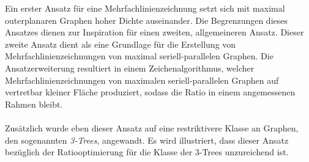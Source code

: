 Ein erster Ansatz für eine Mehrfachlinienzeichnung setzt sich mit maximal outerplanaren Graphen hoher Dichte auseinander. Die Begrenzungen dieses Ansatzes dienen zur Inspiration für einen zweiten, allgemeineren Ansatz. Dieser zweite Ansatz dient als eine Grundlage für die Erstellung von Mehrfachlinienzeichnungen von maximal seriell-parallelen Graphen. Die Ansatzerweiterung resultiert in einem Zeichenalgorithmus, welcher Mehrfachlinienzeichnungen von maximalen seriell-parallelen Graphen auf vertretbar kleiner Fläche produziert, sodass die Ratio in einem angemessenen Rahmen bleibt.\\\\
Zusätzlich wurde eben dieser Ansatz auf eine restriktivere Klasse an Graphen, den sogenannten \emph{3-Trees}, angewandt. Es wird illustriert, dass dieser Ansatz bezüglich der Ratiooptimierung für die Klasse der 3-Trees unzureichend ist.